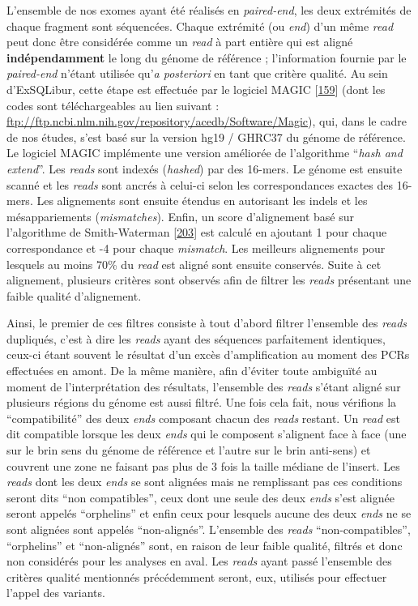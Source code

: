 \documentclass[12pt,a4paper,twoside]{ugathesis}
\theoremstyle{definition}
\theoremstyle{definition}
\theoremstyle{definition}
\theoremstyle{remark}
\begin{document}
L'ensemble de nos exomes ayant été réalisés en \emph{paired-end}, les
deux extrémités de chaque fragment sont séquencées. Chaque extrémité (ou
\emph{end}) d'un même \emph{read} peut donc être considérée comme un
\emph{read} à part entière qui est aligné \textbf{indépendamment} le
long du génome de référence ; l'information fournie par le
\emph{paired-end} n'étant utilisée qu'\emph{a posteriori} en tant que
critère qualité. Au sein d'ExSQLibur, cette étape est effectuée par le
logiciel MAGIC {[}\protect\hyperlink{ref-Su2014}{159}{]} (dont les codes
sont téléchargeables au lien suivant :
\url{ftp://ftp.ncbi.nlm.nih.gov/repository/acedb/Software/Magic}), qui,
dans le cadre de nos études, s'est basé sur la version hg19 / GHRC37 du
génome de référence. Le logiciel MAGIC implémente une version améliorée
de l'algorithme ``\emph{hash and extend}''. Les \emph{reads} sont
indexés (\emph{hashed}) par des 16-mers. Le génome est ensuite scanné et
les \emph{reads} sont ancrés à celui-ci selon les correspondances
exactes des 16-mers. Les alignements sont ensuite étendus en autorisant
les indels et les mésappariements (\emph{mismatches}). Enfin, un score
d'alignement basé sur l'algorithme de Smith-Waterman
{[}\protect\hyperlink{ref-Smith1981}{203}{]} est calculé en ajoutant 1
pour chaque correspondance et -4 pour chaque \emph{mismatch}. Les
meilleurs alignements pour lesquels au moins 70\% du \emph{read} est
aligné sont ensuite conservés. Suite à cet alignement, plusieurs
critères sont observés afin de filtrer les \emph{reads} présentant une
faible qualité d'alignement.

Ainsi, le premier de ces filtres consiste à tout d'abord filtrer
l'ensemble des \emph{reads} dupliqués, c'est à dire les \emph{reads}
ayant des séquences parfaitement identiques, ceux-ci étant souvent le
résultat d'un excès d'amplification au moment des PCRs effectuées en
amont. De la même manière, afin d'éviter toute ambiguïté au moment de
l'interprétation des résultats, l'ensemble des \emph{reads} s'étant
aligné sur plusieurs régions du génome est aussi filtré. Une fois cela
fait, nous vérifions la ``compatibilité'' des deux \emph{ends} composant
chacun des \emph{reads} restant. Un \emph{read} est dit compatible
lorsque les deux \emph{ends} qui le composent s'alignent face à face
(une sur le brin sens du génome de référence et l'autre sur le brin
anti-sens) et couvrent une zone ne faisant pas plus de 3 fois la taille
médiane de l'insert. Les \emph{reads} dont les deux \emph{ends} se sont
alignées mais ne remplissant pas ces conditions seront dits ``non
compatibles'', ceux dont une seule des deux \emph{ends} s'est alignée
seront appelés ``orphelins'' et enfin ceux pour lesquels aucune des deux
\emph{ends} ne se sont alignées sont appelés ``non-alignés''. L'ensemble
des \emph{reads} ``non-compatibles'', ``orphelins'' et ``non-alignés''
sont, en raison de leur faible qualité, filtrés et donc non considérés
pour les analyses en aval. Les \emph{reads} ayant passé l'ensemble des
critères qualité mentionnés précédemment seront, eux, utilisés pour
effectuer l'appel des variants.
\end{document}
